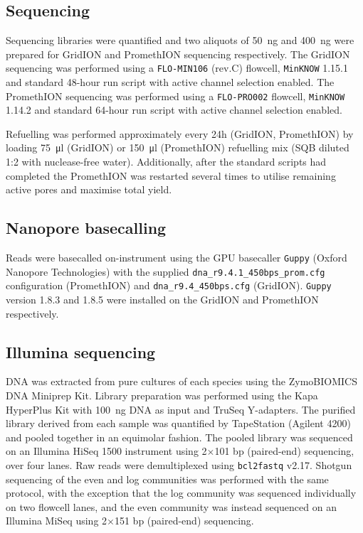 \documentclass[a4paper,num-refs]{oup-contemporary}
\begin{document}
\subsection{Sequencing}

Sequencing libraries were quantified and two aliquots of \SI{50}{\nano\gram} and \SI{400}{\nano\gram} were prepared for GridION and PromethION sequencing respectively. The GridION sequencing was performed using a \texttt{FLO-MIN106} (rev.C) flowcell, \texttt{MinKNOW} 1.15.1 and standard 48-hour run script with active channel selection enabled. The PromethION sequencing was performed using a \texttt{FLO-PRO002} flowcell, \texttt{MinKNOW} 1.14.2 and standard 64-hour run script with active channel selection enabled.

Refuelling was performed approximately every 24h (GridION, PromethION) by loading \SI{75}{\micro\litre} (GridION) or \SI{150}{\micro\litre} (PromethION) refuelling mix (SQB diluted 1:2 with nuclease-free water). Additionally, after the standard scripts had completed the PromethION was restarted several times to utilise remaining active pores and maximise total yield.

\subsection{Nanopore basecalling}
Reads were basecalled on-instrument using the GPU basecaller \texttt{Guppy} (Oxford Nanopore Technologies) with the supplied \texttt{dna\_r9.4.1\_450bps\_prom.cfg} configuration (PromethION) and \texttt{dna\_r9.4\_450bps.cfg} (GridION). \texttt{Guppy} version 1.8.3 and 1.8.5 were installed on the GridION and PromethION respectively.

\subsection{Illumina sequencing}

DNA was extracted from pure cultures of each species using the ZymoBIOMICS DNA Miniprep Kit. Library preparation was performed using the Kapa HyperPlus Kit with \SI{100}{\nano\gram} DNA as input and TruSeq Y-adapters. The purified library derived from each sample was quantified by TapeStation (Agilent 4200) and pooled together in an equimolar fashion. The pooled library was sequenced on an Illumina HiSeq 1500 instrument using 2$\times$101 bp (paired-end) sequencing, over four lanes. Raw reads were demultiplexed using \texttt{bcl2fastq} v2.17.
Shotgun sequencing of the even and log communities was performed with the same protocol, with the exception that the log community was sequenced individually on two flowcell lanes, and the even community was instead sequenced on an Illumina MiSeq using 2$\times$151 bp (paired-end) sequencing.
\end{document}
